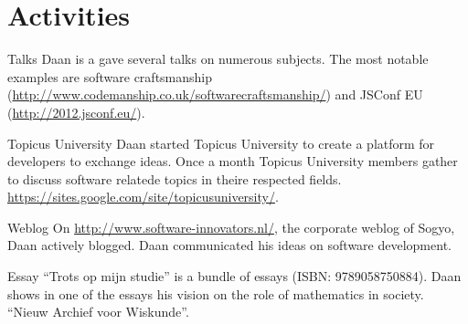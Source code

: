 \section*{Activities}

	\begin{subActivityList}
               \item[Talks] Daan is a gave several talks on numerous
                 subjects. The most notable examples are software
                 craftsmanship
                 (\url{http://www.codemanship.co.uk/softwarecraftsmanship/})
                 and JSConf EU (\url{http://2012.jsconf.eu/}).

		\item[Topicus University] Daan started Topicus
                  University to create a platform for developers to
                  exchange ideas. Once a month Topicus University
                  members gather to discuss software relatede topics
                  in theire respected fields. 
		\url{https://sites.google.com/site/topicusuniversity/}.\hfill\\
	
		\item[Weblog] On \url{http://www.software-innovators.nl/}, the corporate
		weblog of Sogyo, Daan actively blogged. Daan
                communicated his ideas on software development.
		\hfill\\
		
		\item[Essay] ``Trots op mijn studie'' is a bundle of
                  essays (ISBN: 9789058750884). Daan shows in one of
                  the essays his vision on the role of mathematics in society.
		``Nieuw Archief voor Wiskunde''.		
		\hfill\\
	\end{subActivityList}
